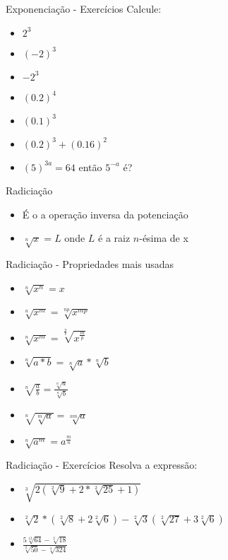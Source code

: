 \begin{frame}
	\begin{block}{Exponenciação - Exercícios}
		Calcule:
		\begin{itemize}
			\item $2^{3}$
			\item $(-2)^{3}$
			\item $-2^{3}$
			\item $(0.2)^{4}$
			\item $(0.1)^{3}$
			\item $(0.2)^{3} + (0.16)^{2}$
			\item $(5)^{3a} = 64$ então $5^{-a}$ é?
		\end{itemize}
	\end{block}
\end{frame}

\begin{frame}
	\begin{block}{Radiciação}
		\begin{itemize}
			\item É o a operação inversa da potenciação
			\item $ \sqrt[n]{x} = L$ onde $L$ é a raiz $n$-ésima de x
		\end{itemize}
	\end{block}
\end{frame}

\begin{frame}
	\begin{block}{Radiciação - Propriedades mais usadas}
		\begin{itemize}
			\item $ \sqrt[n]{x^{n}} = x$
			\item $ \sqrt[n]{x^{m}} = \sqrt[np]{x^{mp}} $
			\item $\sqrt[n]{x^{m}} = \sqrt[\frac{n}{p}]{x^{\frac{m}{p}}} $
			\item $\sqrt[n]{a*b} = \sqrt[n]{a} * \sqrt[n]{b}$
			\item $\sqrt[n]{\frac{a}{b}} = \frac{\sqrt[n]{a}}{\sqrt[n]{b}}$
			\item $\sqrt[n]{\sqrt[m]{a}} = \sqrt[nm]{a}$
			\item $\sqrt[n]{a^{m}} = a^{\frac{m}{n}}$
		\end{itemize}
	\end{block}
\end{frame}

\begin{frame}
	\begin{block}{Radiciação - Exercícios}
		Resolva a expressão:
		\begin{itemize}
			\item $\sqrt[3]{2(\sqrt[2]{9} +2 * \sqrt[2]{25} + 1)}$
			\item $\sqrt[2]{2}*(\sqrt[2]{8} + 2\sqrt[2]{6})-\sqrt[2]{3}(\sqrt[2]{27}+3\sqrt[2]{6})$
			\item $\frac{5\sqrt[12]{64} -\sqrt[2]{18}}{\sqrt[2]{50} - \sqrt[4]{324}}$
		\end{itemize}
	\end{block}
\end{frame}

